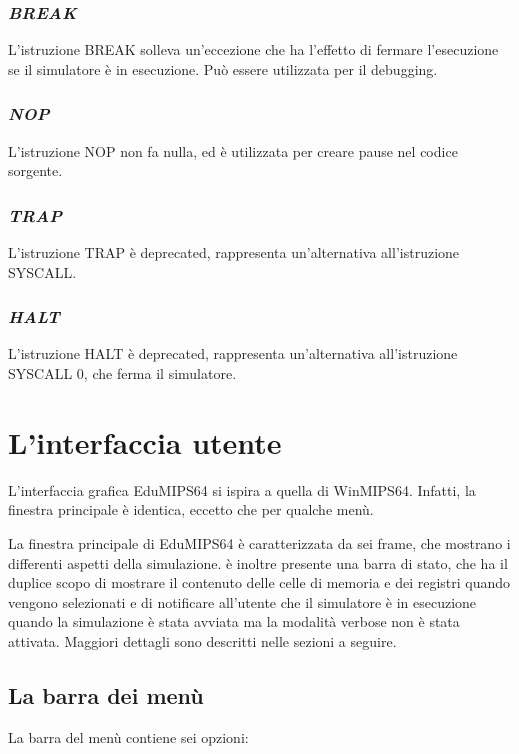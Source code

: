 \documentclass[letterpaper,10pt,italian]{sphinxmanual}
\begin{document}
\subsection{\emph{BREAK}}
\label{instructions:break}
L'istruzione BREAK solleva un'eccezione che ha l'effetto di fermare
l'esecuzione se il simulatore è in esecuzione. Può essere utilizzata per
il debugging.


\subsection{\emph{NOP}}
\label{instructions:nop}
L'istruzione NOP non fa nulla, ed è utilizzata per creare pause nel codice
sorgente.


\subsection{\emph{TRAP}}
\label{instructions:trap}
L'istruzione TRAP è deprecated, rappresenta un'alternativa all'istruzione
SYSCALL.


\subsection{\emph{HALT}}
\label{instructions:halt}
L'istruzione HALT è deprecated, rappresenta un'alternativa all'istruzione
SYSCALL 0, che ferma il simulatore.


\chapter{L'interfaccia utente}
\label{user-interface:l-interfaccia-utente}\label{user-interface::doc}
L'interfaccia grafica EduMIPS64 si ispira a quella di WinMIPS64. Infatti, la
finestra principale è identica, eccetto che per qualche menù.

La finestra principale di EduMIPS64 è caratterizzata da sei frame, che
mostrano i differenti aspetti della simulazione.  è inoltre presente una
barra di stato, che ha il duplice scopo di mostrare il contenuto delle celle
di memoria e dei registri quando vengono selezionati e di notificare
all'utente che il simulatore è in esecuzione quando la simulazione è
stata avviata ma la modalità verbose  non è stata attivata.  Maggiori
dettagli sono descritti nelle sezioni a seguire.


\section{La barra dei menù}
\label{user-interface:la-barra-dei-menu}
La barra del menù contiene sei opzioni:
\end{document}
